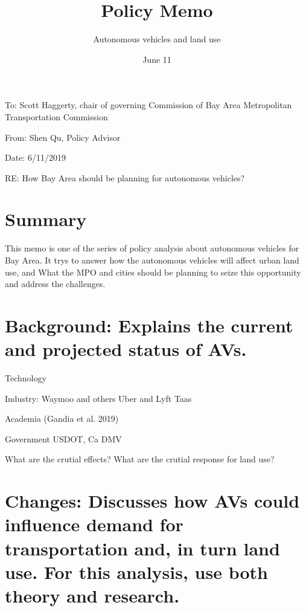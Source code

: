 \documentclass[12pt,]{article}
\title{Policy Memo}
\subtitle{Autonomous vehicles and land use}
\author{}
\date{June 11}
\begin{document}
\maketitle

To: Scott Haggerty, chair of governing Commission of Bay Area
Metropolitan Transportation Commission

From: Shen Qu, Policy Advisor

Date: 6/11/2019

RE: How Bay Area should be planning for autonomous vehicles?

\hypertarget{summary}{%
\section{Summary}\label{summary}}

This memo is one of the series of policy analysis about autonomous
vehicles for Bay Area. It trys to answer how the autonomous vehicles
will affect urban land use, and What the MPO and cities should be
planning to seize this opportunity and address the challenges.

\hypertarget{background-explains-the-current-and-projected-status-of-avs.}{%
\section{Background: Explains the current and projected status of
AVs.}\label{background-explains-the-current-and-projected-status-of-avs.}}

Technology

Industry: Waymoo and others Uber and Lyft Taas

Academia (Gandia et al. 2019)

Government USDOT, Ca DMV

What are the crutial effects? What are the crutial response for land
use?

\hypertarget{changes-discusses-how-avs-could-influence-demand-for-transportation-and-in-turn-land-use.-for-this-analysis-use-both-theory-and-research.}{%
\section{Changes: Discusses how AVs could influence demand for
transportation and, in turn land use. For this analysis, use both theory
and
research.}\label{changes-discusses-how-avs-could-influence-demand-for-transportation-and-in-turn-land-use.-for-this-analysis-use-both-theory-and-research.}}
\end{document}
